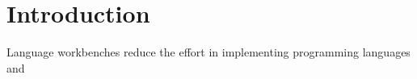 \chapter{Introduction}

Language workbenches reduce the effort in implementing programming languages and 
